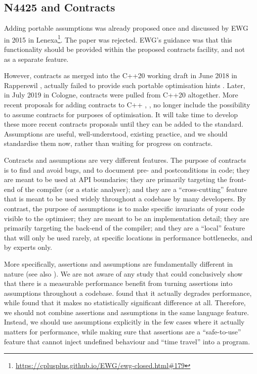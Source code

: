 \subsection{N4425 and Contracts}
\label{sec:contracts}

Adding portable assumptions was already proposed once \cite{N4425} and discussed by EWG in 2015 in Lenexa\footnote{\url{https://cplusplus.github.io/EWG/ewg-closed.html\#179}}. The paper was rejected. EWG's guidance was that this functionality should be provided within the proposed contracts facility, and not as a separate feature.

However, contracts as merged into the C++20 working draft in June 2018 in Rapperswil \cite{P0542R5}, actually failed to provide such portable optimisation hints \cite{P1773R0}. Later, in July 2019 in Cologne, contracts were pulled from C++20 altogether. More recent proposals for adding contracts to C++  \cite{P2388R4}, \cite{P2461R1}, \cite{P2487R0} no longer include the possibility to assume contracts for purposes of optimisation. It will take time to develop these more recent contracts proposals until they can be added to the standard. Assumptions are useful, well-understood, existing practice, and we should standardise them now, rather than waiting for progress on contracts.

Contracts and assumptions are very different features. The purpose of contracts is to find and avoid bugs, and to document pre- and postconditions in code; they are meant to be used at API boundaries; they are primarily targeting the front-end of the compiler (or a static analyser); and they are a ``cross-cutting'' feature that is meant to be used widely throughout a codebase by many developers. By contrast, the purpose of assumptions is to make specific invariants of your code visible to the optimiser; they are meant to be an implementation detail; they are primarily targeting the back-end of the compiler; and they are a ``local'' feature that will only be used rarely, at specific locations in performance bottlenecks, and by experts only.

More specifically, assertions and assumptions are fundamentally different in nature (see also \cite{P2064R0}). We are not aware of any study that could conclusively show that there is a measurable performance benefit from turning assertions into assumptions throughout a codebase. \cite{P2064R0} found that it actually degrades performance, while \cite{Amini2021} found that it makes no statistically significant difference at all. Therefore, we should not combine assertions and assumptions in the same language feature. Instead, we should use assumptions explicitly in the few cases where it actually matters for performance, while making sure that assertions are a ``safe-to-use'' feature that cannot inject undefined behaviour and ``time travel'' into a program.

